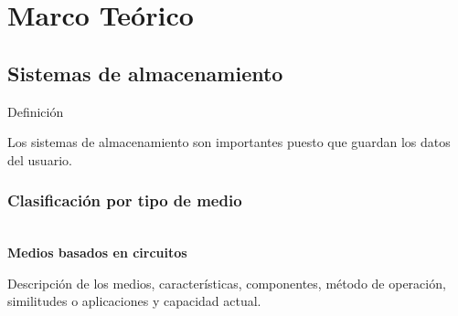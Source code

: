   \chapter{Marco Te\'{o}rico}
  \label{chap:cap1}
    \section {Sistemas de almacenamiento}
    
Definici\'{o}n

Los sistemas de almacenamiento son importantes puesto que guardan los datos del usuario.

%

\subsection {Clasificaci\'{o}n por tipo de medio}

%
%

\textbf{\\ Medios basados en circuitos \\}

Descripci\'{o}n de los medios, caracter\'{i}sticas, componentes, m\'{e}todo de operaci\'{o}n, similitudes o aplicaciones y capacidad actual.

